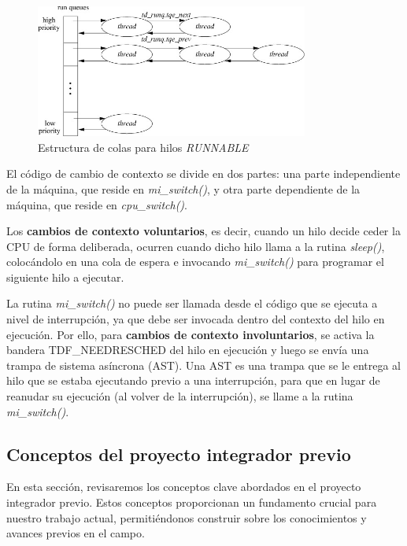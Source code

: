 \begin{figure}[H]
    \centering
    \includegraphics[width=0.8\textwidth]{./images/queueing-structure.jpg}
    \caption{Estructura de colas para hilos \textit{RUNNABLE}}
    \label{fig:queueing-structure}
\end{figure}

El código de cambio de contexto se divide en dos partes: una parte independiente de la máquina, que reside en \textit{mi\_switch()}, y otra parte dependiente de la máquina, que reside en \textit{cpu\_switch()}.\par

Los \textbf{cambios de contexto voluntarios}, es decir, cuando un hilo decide ceder la CPU de forma deliberada, ocurren cuando dicho hilo llama a la rutina \textit{sleep()}, colocándolo en una cola de espera e invocando \textit{mi\_switch()} para programar el siguiente hilo a ejecutar.\par

La rutina \textit{mi\_switch()} no puede ser llamada desde el código que se ejecuta a nivel de interrupción, ya que debe ser invocada dentro del contexto del hilo en ejecución. Por ello, para \textbf{cambios de contexto involuntarios}, se activa la bandera TDF\_NEEDRESCHED del hilo en ejecución y luego se envía una trampa de sistema asíncrona (AST). Una AST es una trampa que se le entrega al hilo que se estaba ejecutando previo a una interrupción, para que en lugar de reanudar su ejecución (al volver de la interrupción), se llame a la rutina \textit{mi\_switch()}.\par

\subsection{Conceptos del proyecto integrador previo}

En esta sección, revisaremos los conceptos clave abordados en el proyecto integrador previo. Estos conceptos proporcionan un fundamento crucial para nuestro trabajo actual, permitiéndonos construir sobre los conocimientos y avances previos en el campo.

